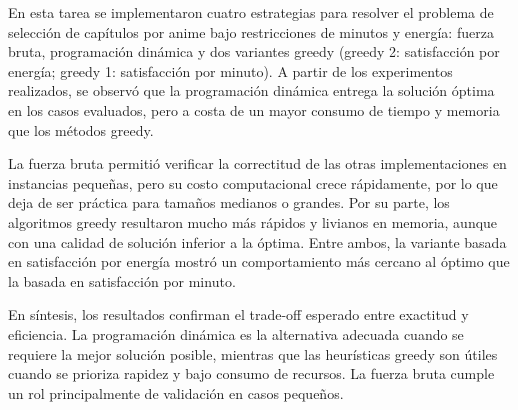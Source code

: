 

En esta tarea se implementaron cuatro estrategias para resolver el problema de selección de capítulos por anime bajo restricciones de minutos y energía: fuerza bruta, programación dinámica y dos variantes greedy (greedy 2: satisfacción por energía; greedy 1: satisfacción por minuto). A partir de los experimentos realizados, se observó que la programación dinámica entrega la solución óptima en los casos evaluados, pero a costa de un mayor consumo de tiempo y memoria que los métodos greedy.

La fuerza bruta permitió verificar la correctitud de las otras implementaciones en instancias pequeñas, pero su costo computacional crece rápidamente, por lo que deja de ser práctica para tamaños medianos o grandes. Por su parte, los algoritmos greedy resultaron mucho más rápidos y livianos en memoria, aunque con una calidad de solución inferior a la óptima. Entre ambos, la variante basada en satisfacción por energía mostró un comportamiento más cercano al óptimo que la basada en satisfacción por minuto.

En síntesis, los resultados confirman el trade-off esperado entre exactitud y eficiencia. La programación dinámica es la alternativa adecuada cuando se requiere la mejor solución posible, mientras que las heurísticas greedy son útiles cuando se prioriza rapidez y bajo consumo de recursos. La fuerza bruta cumple un rol principalmente de validación en casos pequeños.
